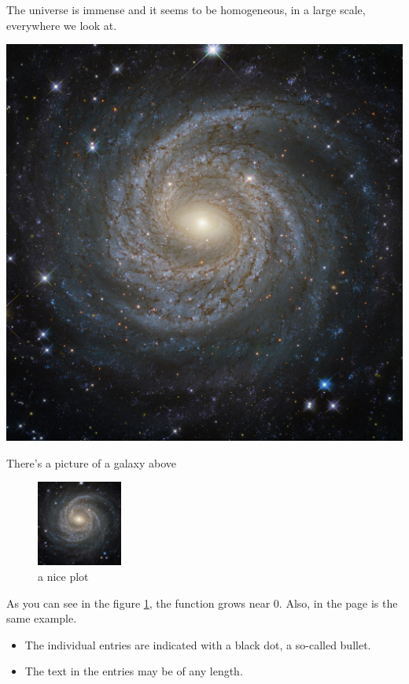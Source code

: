 \documentclass[12pt, letterpape]{article}
\begin{document}
The universe is immense and it seems to be homogeneous, 
in a large scale, everywhere we look at.
 
\includegraphics[scale=0.1]{image.jpg}
 
 {\selectfont
There's a picture of a galaxy above
}

\begin{figure}[h]
    \centering
    \includegraphics[width=0.25\textwidth]{image.jpg}
    \caption{a nice plot}
    \label{fig:mesh1}
\end{figure}

As you can see in the figure \ref{fig:mesh1}, the 
function grows near 0. Also, in the page \pageref{fig:mesh1} 
is the same example.

\begin{itemize}
  \item The individual entries are indicated with a black dot, a so-called bullet.
  \item The text in the entries may be of any length.
\end{itemize}
\end{document}
